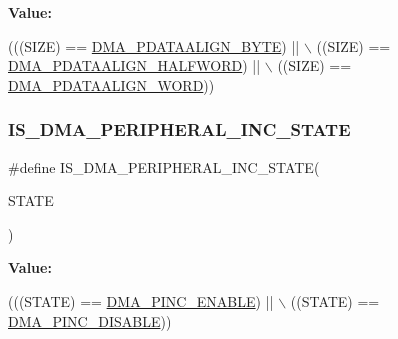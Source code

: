 {\bfseries Value\+:}
\begin{DoxyCode}
(((SIZE) == \hyperlink{group___d_m_a___peripheral__data__size_ga55b8c8f5ec95f10d26d6c5b1c9136730}{DMA\_PDATAALIGN\_BYTE})     || \(\backslash\)
                                           ((SIZE) == \hyperlink{group___d_m_a___peripheral__data__size_gac08bfd907442dba5358830b247135bcc}{DMA\_PDATAALIGN\_HALFWORD}) || \(\backslash\)
                                           ((SIZE) == \hyperlink{group___d_m_a___peripheral__data__size_gaad50e97cbc4a726660db9c3f42ac93b0}{DMA\_PDATAALIGN\_WORD}))
\end{DoxyCode}
\mbox{\label{group___d_m_a___private___macros_ga28762105b3f567c16ba79a47e68ff0fa}} 
\subsubsection{\texorpdfstring{I\+S\+\_\+\+D\+M\+A\+\_\+\+P\+E\+R\+I\+P\+H\+E\+R\+A\+L\+\_\+\+I\+N\+C\+\_\+\+S\+T\+A\+TE}{IS\_DMA\_PERIPHERAL\_INC\_STATE}}
{\footnotesize\ttfamily \#define I\+S\+\_\+\+D\+M\+A\+\_\+\+P\+E\+R\+I\+P\+H\+E\+R\+A\+L\+\_\+\+I\+N\+C\+\_\+\+S\+T\+A\+TE(\begin{DoxyParamCaption}\item[{}]{S\+T\+A\+TE }\end{DoxyParamCaption})}

{\bfseries Value\+:}
\begin{DoxyCode}
(((STATE) == \hyperlink{group___d_m_a___peripheral__incremented__mode_gab6d84e5805302516d26c06fb4497a346}{DMA\_PINC\_ENABLE}) || \(\backslash\)
                                            ((STATE) == \hyperlink{group___d_m_a___peripheral__incremented__mode_ga63e2aff2973d1a8f01d5d7b6e4894f39}{DMA\_PINC\_DISABLE}))
\end{DoxyCode}
\mbox{\label{group___d_m_a___private___macros_gaa1cae2ab458948511596467c87cd02b6}} 
